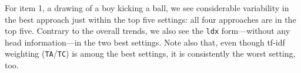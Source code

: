 \documentclass[11pt,letterpaper]{article}
\newcommand{\param}[1]{\texttt{#1}}
\newcommand{\md}[1]{\marginpar{\scriptsize MD: #1}}
\newcommand{\lk}[1]{\marginpar{\scriptsize LK: #1}}
\renewcommand{\marginpar}[1]{}
\begin{document}

For item 1, a drawing of a boy kicking a ball, we see considerable
variability in the best approach just within the top five settings:
all four approaches are in the top five.  Contrary to the overall
trends, we also see the \param{ldx} form---without any head
information---in the two best settings.  Note also that, even though
tf-idf weighting (\param{TA}/\param{TC}) is among the best settings, it is
consistently the worst setting, too.


\end{document}
